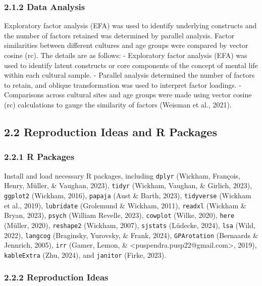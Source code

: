 \documentclass[
  man]{apa6}
\begin{document}
\hypertarget{data-analysis}{%
\subsubsection{2.1.2 Data Analysis}\label{data-analysis}}

Exploratory factor analysis (EFA) was used to identify underlying
constructs and the number of factors retained was determined by parallel
analysis. Factor similarities between different cultures and age groups
were compared by vector cosine (rc). The details are as follows: -
Exploratory factor analysis (EFA) was used to identify latent constructs
or core components of the concept of mental life within each cultural
sample. - Parallel analysis determined the number of factors to retain,
and oblique transformation was used to interpret factor loadings. -
Comparisons across cultural sites and age groups were made using vector
cosine (rc) calculations to gauge the similarity of factors (Weisman et al., 2021).

\hypertarget{reproduction-ideas-and-r-packages}{%
\subsection{2.2 Reproduction Ideas and R Packages}\label{reproduction-ideas-and-r-packages}}

\hypertarget{r-packages}{%
\subsubsection{2.2.1 R Packages}\label{r-packages}}

Install and load necessary R packages, including \texttt{dplyr} (Wickham, François, Henry, Müller, \& Vaughan, 2023), \texttt{tidyr} (Wickham, Vaughan, \& Girlich, 2023),
\texttt{ggplot2} (Wickham, 2016), \texttt{papaja} (Aust \& Barth, 2023), \texttt{tidyverse} (Wickham et al., 2019), \texttt{lubridate} (Grolemund \& Wickham, 2011),
\texttt{readxl} (Wickham \& Bryan, 2023), \texttt{psych} (William Revelle, 2023), \texttt{cowplot} (Wilke, 2020), \texttt{here} (Müller, 2020), \texttt{reshape2} (Wickham, 2007),
\texttt{sjstats} (Lüdecke, 2024), \texttt{lsa} (Wild, 2022), \texttt{langcog} (Braginsky, Yurovsky, \& Frank, 2024), \texttt{GPArotation} (Bernaards \& Jennrich, 2005),
\texttt{irr} (Gamer, Lemon, \& \textless puspendra.pusp22@gmail.com\textgreater, 2019), \texttt{kableExtra} (Zhu, 2024), and \texttt{janitor} (Firke, 2023).

\hypertarget{reproduction-ideas}{%
\subsubsection{2.2.2 Reproduction Ideas}\label{reproduction-ideas}}
\end{document}
